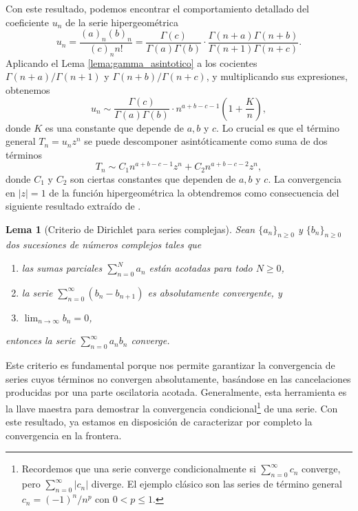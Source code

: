 \documentclass[12pt,a4paper]{book}
\newtheorem{lemma}[theorem]{Lema}
\begin{document}
Con este resultado, podemos encontrar el comportamiento detallado del coeficiente $u_n$ de la serie hipergeométrica
\[
u_n = \frac{(a)_n (b)_n}{(c)_n n!} = \frac{\Gamma(c)}{\Gamma(a)\Gamma(b)} \cdot \frac{\Gamma(n+a)\Gamma(n+b)}{\Gamma(n+1)\Gamma(n+c)}.
\]
Aplicando el Lema \ref{lema:gamma_asintotico} a los cocientes $\Gamma(n+a)/\Gamma(n+1)$ y $\Gamma(n+b)/\Gamma(n+c)$, y multiplicando sus expresiones, obtenemos
\[
u_n \sim \frac{\Gamma(c)}{\Gamma(a)\Gamma(b)} \cdot n^{a+b-c-1} \left(1 + \frac{K}{n} \right),
\]
donde $K$ es una constante que depende de $a, b$ y $c$. Lo crucial es que el término general $T_n = u_n z^n$ se puede descomponer asintóticamente como suma de dos términos
\begin{equation}
\label{eq3}
   T_n \sim C_1 n^{a+b-c-1} z^n + C_2 n^{a+b-c-2} z^n, 
\end{equation}
donde $C_1$ y $C_2$ son ciertas constantes que dependen de $a, b$ y $c$. La convergencia en $|z|=1$ de la función hipergeométrica la obtendremos como consecuencia del siguiente resultado extraído de  \cite[pág.~243]{bromwich}.

\begin{lemma}[Criterio de Dirichlet para series complejas]
\label{lema:dirichlet_complejo}
Sean $\{a_n\}_{n \geq 0}$ y $\{b_n\}_{n \geq 0}$ dos sucesiones de números complejos tales que
\begin{enumerate} [label=\alph*)]
    \item las sumas parciales $\sum_{n=0}^N a_n$ están acotadas para todo $N \ge 0$,
    \item la serie $\sum_{n=0}^\infty (b_n - b_{n+1})$ es absolutamente convergente, y
    \item $\lim_{n \to \infty} b_n = 0$,
\end{enumerate}
entonces la serie $\sum_{n=0}^\infty a_n b_n$ converge.
\end{lemma}

Este criterio es fundamental porque nos permite garantizar la convergencia de series cuyos términos no convergen absolutamente, basándose en las cancelaciones producidas por una parte oscilatoria acotada. Generalmente, esta herramienta es la llave maestra para demostrar la convergencia condicional\footnote{Recordemos que una serie converge condicionalmente si $\sum_{n=0}^\infty c_n$ converge, pero $\sum_{n=0}^\infty |c_n|$ diverge. El ejemplo clásico son las series  de término general $c_n = (-1)^n/n^p$ con $0 < p \le 1$.} de una serie. Con este resultado, ya estamos en disposición de caracterizar por completo la convergencia en la frontera.
\end{document}
